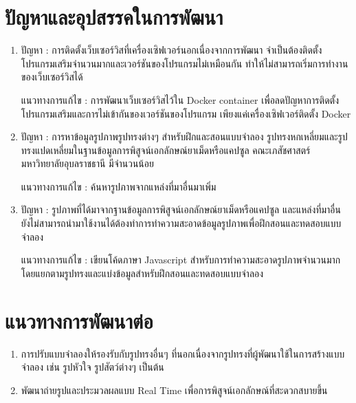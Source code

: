 \section{ปัญหาและอุปสรรคในการพัฒนา}
  \begin{enumerate}
    \item ปัญหา : การติดตั้งเว็บเซอร์วิสที่เครื่องเซิฟเวอร์นอกเนื่องจากการพัฒนา จำเป็นต้องติดตั้งโปรแกรมเสริมจำนวนมากและเวอร์ชันของโปรแกรมไม่เหมือนกัน ทำให้ไม่สามารถเริ่มการทำงานของเว็บเซอร์วิสได้ 
    
    แนวทางการแก้ไข : การพัฒนาเว็บเซอร์วิสไว้ใน Docker container เพื่อลดปัญหาการติดตั้งโปรแกรมเสริมและการไม่เข้ากันของเวอร์ชันของโปรแกรม เพียงแค่เครื่องเซิฟเวอร์ติดตั้ง Docker
    \item ปัญหา : การหาข้อมูลรูปภาพรูปทรงต่างๆ สำหรับฝึกและสอนแบบจำลอง รูปทรงหกเหลี่ยมและรูปทรงแปดเหลี่ยมในฐานข้อมูลการพิสูจน์เอกลักษณ์ยาเม็ดหรือแคปซูล คณะเภสัชศาสตร์ มหาวิทยาลัยอุบลราชธานี มีจำนวนน้อย
    
    แนวทางการแก้ไข : ค้นหารูปภาพจากแหล่งที่มาอื่นมาเพิ่ม
    \item ปัญหา : รูปภาพที่ได้มาจากฐานข้อมูลการพิสูจน์เอกลักษณ์ยาเม็ดหรือแคปซูล และแหล่งที่มาอื่น ยังไม่สามารถนำมาใช้งานได้ต้องทำการทำความสะอาดข้อมูลรูปภาพเพื่อฝึกสอนและทดสอบแบบจำลอง 
    
    แนวทางการแก้ไข : เขียนโค้ดภาษา Javascript สำหรับการทำความสะอาดรูปภาพจำนวนมาก โดยแยกตามรูปทรงและแบ่งข้อมูลสำหรับฝึกสอนและทดสอบแบบจำลอง
    
  \end{enumerate}

\section{แนวทางการพัฒนาต่อ}
\begin{enumerate}
	\item การปรับแบบจำลองให้รองรับกับรูปทรงอื่นๆ ที่นอกเนื่องจากรูปทรงที่ผู้พัฒนาใช้ในการสร้างแบบจำลอง เช่น รูปหัวใจ รูปสัตว์ต่างๆ เป็นต้น
  \item พัฒนาถ่ายรูปและประมวลผลแบบ Real Time เพื่อการพิสูจน์เอกลักษณ์ที่สะดวกสบายขึ้น
\end{enumerate}








